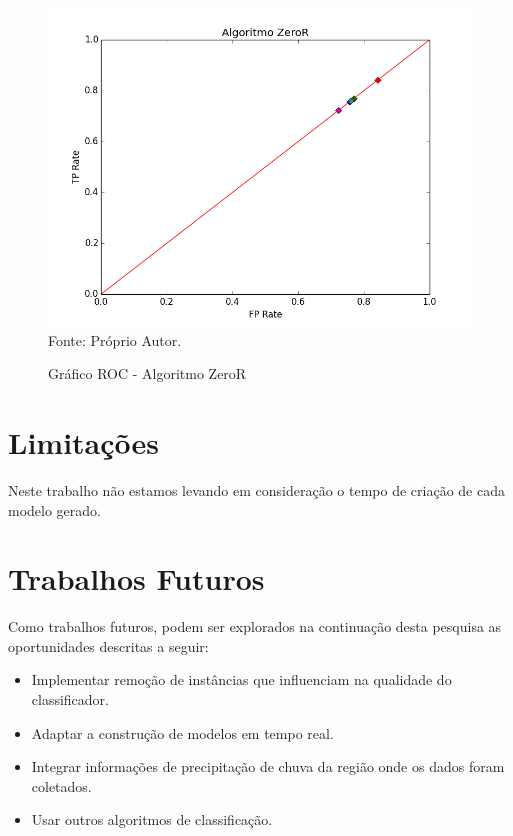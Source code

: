 \documentclass[
	12pt,				%
	openright,			%
	oneside,	
	a4paper,				%
	english,				%
	brazil				%
]{abntex2/abntex2} %
\begin{document}
	\pagebreak
	\clearpage
	\newpage
	
	
	\begin{figure}[!htb]
		\caption{\label{figRocZeroR} Gráfico ROC - Algoritmo ZeroR}
		\begin{center}
			\includegraphics[scale=0.8]{python/ZeroR.png}
			Fonte: Próprio Autor.
		\end{center}
	\end{figure}
	
	\newpage
	\newpage
	\section{Limitações}
	
	Neste trabalho não estamos levando em consideração o tempo de criação de cada modelo gerado.
	
	\section{Trabalhos Futuros}
	
	Como trabalhos futuros, podem ser explorados na continuação desta pesquisa as oportunidades descritas a seguir:
	
	\begin{itemize}
		\item Implementar remoção de instâncias que influenciam na qualidade do classificador.
		\item Adaptar a construção de modelos em tempo real.
		\item Integrar informações de precipitação de chuva da região onde os dados foram coletados.
		\item Usar outros algoritmos de classificação.
	\end{itemize}
\end{document}
